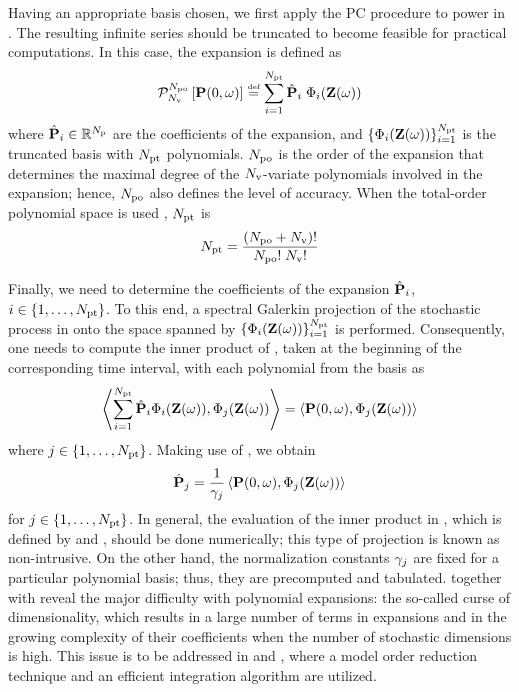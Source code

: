 Having an appropriate basis chosen, we first apply the PC procedure to power in . The resulting infinite series should be truncated to become feasible for practical computations. In this case, the expansion is defined as
\begin{equation} \elabel{pc-expansion}
  \oPC{\vars}{\pcorder}{\vP(0, \o)} \eqdef \sum_{i = 1}^{\pcterms} \pcc{\vP}_i \; \pcb_i(\vZ(\o))
\end{equation}
where $\hat{\mathbf{P}}_i \in \mathbb{R}^{N_\text{p}}$ are the coefficients of the expansion, and $\{ \Phi_i(\mathbf{Z}(\omega)) \}_{i = 1}^{{N_\text{pt}}}$ is the truncated basis with ${N_\text{pt}}$ polynomials. ${N_\text{po}}$ is the order of the expansion that determines the maximal degree of the ${N_\text{v}}$-variate polynomials involved in the expansion; hence, ${N_\text{po}}$ also defines the level of accuracy. When the total-order polynomial space is used \cite{beck2011}, ${N_\text{pt}}$ is
\begin{equation} \elabel{pc-terms}
  \pcterms = \frac{(\pcorder + \vars)!}{\pcorder! \; \vars!}
\end{equation}

Finally, we need to determine the coefficients of the expansion $\hat{\mathbf{P}}_i$, $i \in \{ 1, \dotsc, {N_\text{pt}} \}$. To this end, a spectral Galerkin projection of the stochastic process in  onto the space spanned by $\{ \Phi_i(\mathbf{Z}(\omega)) \}_{i = 1}^{{N_\text{pt}}}$ is performed. Consequently, one needs to compute the inner product of , taken at the beginning of the corresponding time interval, with each polynomial from the basis as
\[
  \oInner{\sum_{i=1}^{\pcterms} \pcc{\vP}_i \pcb_i(\vZ(\o))}{\pcb_j(\vZ(\o))} = \oInner{\vP(0, \o)}{\pcb_j(\vZ(\o))}
\]
where $j \in \{ 1, \dotsc, {N_\text{pt}} \}$. Making use of , we obtain
\begin{equation} \elabel{pc-coefficients}
  \pcc{\vP}_j = \frac{1}{\pcn_j} \oInner{\vP(0, \o)}{\pcb_j(\vZ(\o))}
\end{equation}
for $j \in \{ 1, \dotsc, {N_\text{pt}} \}$. In general, the evaluation of the inner product in , which is defined by  and , should be done numerically; this type of projection is known as non-intrusive. On the other hand, the normalization constants $\gamma_j$ are fixed for a particular polynomial basis; thus, they are precomputed and tabulated.  together with  reveal the major difficulty with polynomial expansions: the so-called curse of dimensionality, which results in a large number of terms in expansions and in the growing complexity of their coefficients when the number of stochastic dimensions is high. This issue is to be addressed in  and , where a model order reduction technique and an efficient integration algorithm are utilized.

